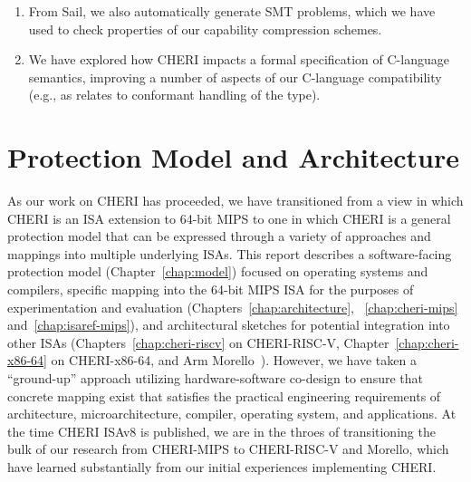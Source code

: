 \begin{enumerate}

\item From Sail, we also automatically generate SMT problems, which we
  have used to check properties of our capability compression
  schemes. 


\item We have explored how CHERI impacts a formal specification of C-language
  semantics, improving a number of aspects of our C-language compatibility
  (e.g., as relates to conformant handling of the  type).
\end{enumerate}


\section{Protection Model and Architecture}

As our work on CHERI has proceeded, we have transitioned from a view in which
CHERI is an ISA extension to 64-bit MIPS to one in which CHERI is a general
protection model that can be expressed through a variety of approaches
and mappings into multiple underlying ISAs.
This report describes a software-facing protection model
(Chapter~\ref{chap:model}) focused on operating systems and compilers,
specific mapping into the 64-bit MIPS ISA for the purposes of experimentation
and evaluation (Chapters~\ref{chap:architecture}, ~\ref{chap:cheri-mips}
and~\ref{chap:isaref-mips}), and architectural sketches for potential integration
into other ISAs (Chapters~\ref{chap:cheri-riscv} on CHERI-RISC-V,
Chapter~\ref{chap:cheri-x86-64} on CHERI-x86-64, and Arm
Morello~\cite{arm-morello}).
However, we have taken a ``ground-up'' approach utilizing hardware-software
co-design to ensure that concrete mapping exist that
satisfies the practical engineering requirements of architecture,
microarchitecture, compiler, operating system, and applications.
At the time CHERI ISAv8 is published, we are in the throes of transitioning
the bulk of our research from CHERI-MIPS to CHERI-RISC-V and Morello, which
have learned substantially from our initial experiences implementing CHERI.

